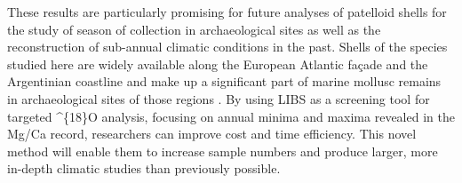 \documentclass[
  authoryear,
  preprint,
  3p]{elsarticle}
\begin{document}
These results are particularly promising for future analyses of
patelloid shells for the study of season of collection in archaeological
sites as well as the reconstruction of sub-annual climatic conditions in
the past. Shells of the species studied here are widely available along
the European Atlantic façade and the Argentinian coastline and make up a
significant part of marine mollusc remains in archaeological sites of
those regions
\citep{Colonese2011-ab, Villagran2011-ld, Zangrando2016-yl}. By using
LIBS as a screening tool for targeted \delta\^{}\{18\}O analysis,
focusing on annual minima and maxima revealed in the Mg/Ca record,
researchers can improve cost and time efficiency. This novel method will
enable them to increase sample numbers and produce larger, more in-depth
climatic studies than previously possible.


\renewcommand\refname{References}
 

\end{document}
